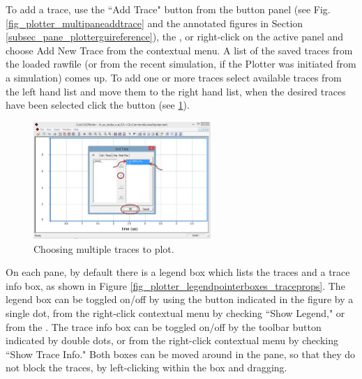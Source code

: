 To add a trace, use the ``Add Trace" button from the button panel (see Fig. \ref{fig_plotter_multipaneaddtrace} and the annotated figures in Section \ref{subsec_pane_plotterguireference}), the , or right-click on the active panel and choose \textsf{Add New Trace} from the contextual menu. A list of the saved traces from the loaded rawfile (or from the recent simulation, if the Plotter was initiated from a simulation) comes up. To add one or more traces select available traces from the left hand list and move them to the right hand list, when the desired traces have been selected click the  button (see \ref{fig_plotter_multipletraceadd}). 



\begin{figure}
    \includegraphics[width=0.6\textwidth]{./figures/plotter_netlist_editor_figures/Plotter_AddingTraces_SinglePanel.png}
    \caption{{Choosing multiple traces to plot.}}
  \label{fig_plotter_multipletraceadd}
\end{figure}

 On each pane, by default there is a legend box which lists the traces and a trace info box, as shown in Figure \ref{fig_plotter_legendpointerboxes_traceprops}. The legend box can be toggled on/off by using the button indicated in the figure by a single dot, from the right-click contextual menu by checking ``\textsf{Show Legend}," or from the . The trace info box can be toggled on/off by the toolbar button indicated by double dots, or from the right-click contextual menu by checking ``\textsf{Show Trace Info}." Both boxes can be moved around in the pane, so that they do not block the traces, by left-clicking within the box and dragging.

